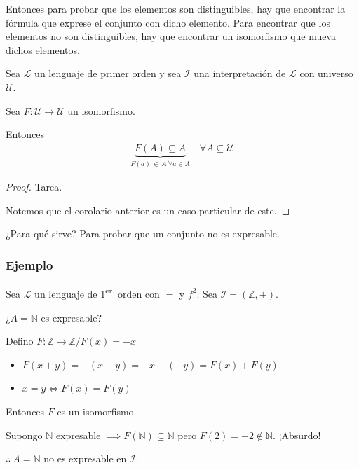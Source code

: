 Entonces para probar que los elementos son distinguibles, hay que encontrar
la fórmula que exprese el conjunto con dicho elemento. Para encontrar que
los elementos no son distinguibles, hay que encontrar un isomorfismo que
mueva dichos elementos.

\bigskip

\begin{corolario}{}{}
    Sea $\mathcal{L}$ un lenguaje de primer orden y sea $\mathcal{I}$ una
    interpretación de $\mathcal{L}$ con universo $\mathcal{U}$.

    Sea $F: \mathcal{U} \to \mathcal{U}$ un isomorfismo.

    \medskip

    Entonces
    \begin{gather*}
        \underbrace{F(A) \subseteq A}_{F(a) \, \in \, A ~ \forall a \in A}
        \quad \forall A \subseteq \mathcal{U}
    \end{gather*}
\end{corolario}

\begin{proof} \phantom{.}
    Tarea.

    Notemos que el corolario anterior es un caso particular de este.
\end{proof}

¿Para qué sirve? Para probar que un conjunto no es expresable.

\subsubsection{Ejemplo}

Sea $\mathcal{L}$ un lenguaje de 1\textsuperscript{er.} orden con $=$ y $f^2$.
Sea $\mathcal{I} = (\mathbb{Z}, +)$.

¿$A = \mathbb{N}$ es expresable?

%
Defino $F: \mathbb{Z} \to \mathbb{Z} / F(x) = -x$
\begin{itemize}
    \item $F(x+y) = -(x+y) = -x + (-y) = F(x) + F(y)$
    \item $x = y \iff F(x) = F(y)$
\end{itemize}

Entonces $F$ es un isomorfismo.

Supongo $\mathbb{N}$ expresable $\implies F(\mathbb{N}) \subseteq \mathbb{N}$
pero $F(2) = -2 \notin \mathbb{N}$.
¡Absurdo!

\begin{center}
    $\therefore ~ A = \mathbb{N}$ no es expresable en $\mathcal{I}$.
\end{center}



